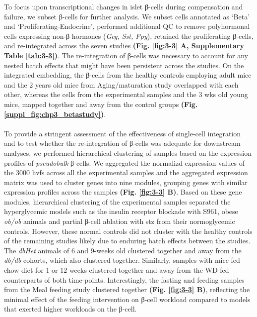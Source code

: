 To focus upon transcriptional changes in islet β-cells during compensation and failure, we subset β-cells for further analysis. We subset cells annotated as `Beta' and `Proliferating-Endocrine', performed additional QC to remove polyhormonal cells expressing non-β hormones (\textit{Gcg, Sst, Ppy}), retained the proliferating β-cells, and re-integrated across the seven studies \textbf{(Fig. \ref{fig:3-3} A, Supplementary Table \ref{tab:3-3})}. The re-integration of β-cells was necessary to account for any nested batch effects that might have been persistent across the studies. On the integrated embedding, the β-cells from the healthy controls employing adult mice and the 2 years old mice from Aging/maturation study overlapped with each other, whereas the cells from the experimental samples and the 3 wks old young mice, mapped together and away from the control groups \textbf{(Fig. \ref{suppl_fig:chp3_betastudy})}.\\\\
To provide a stringent assessment of the effectiveness of single-cell integration and to test whether the re-integration of β-cells was adequate for downstream analyses, we performed hierarchical clustering of samples based on the expression profiles of \textit{pseudobulk} β-cells. We aggregated the normalizd expression values of the 3000 \glspl{hvf} across all the experimental samples and the aggregated expression matrix was used to cluster genes into nine modules, grouping genes with similar expression profiles across the samples \textbf{(Fig. \ref{fig:3-3} B)}. Based on these gene modules, hierarchical clustering of the experimental samples separated the hyperglycemic models such as the insulin receptor blockade with S961, obese \textit{ob/ob} animals and partial β-cell ablation with \gls{stz} from their normoglycemic controls. However, these normal controls did not cluster with the healthy controls of the remaining studies likely due to enduring batch effects between the studies. The \textit{dbHet} animals of 6 and 9-weeks old clustered together and away from the \textit{db/db} cohorts, which also clustered together. Similarly, samples with mice fed chow diet for 1 or 12 weeks clustered together and away from the WD-fed counterparts of both time-points. Interestingly, the fasting and feeding samples from the Meal feeding study clustered together \textbf{(Fig. \ref{fig:3-3} B)}, reflecting the minimal effect of the feeding intervention on β-cell workload compared to models that exerted higher workloads on the β-cell.\\

